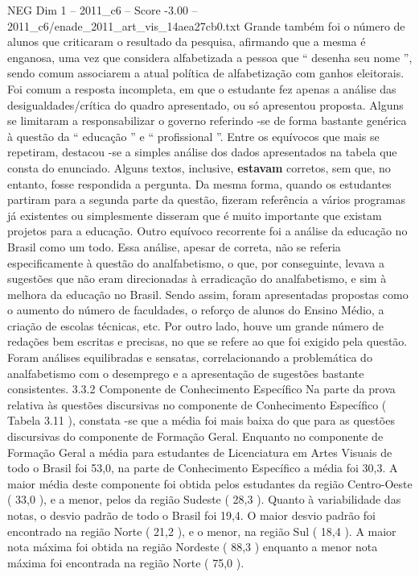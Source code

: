 \begin{textsample}{NEG Dim 1 – 2011\_c6 – Score -3.00 – 2011\_c6/enade\_2011\_art\_vis\_14aea27cb0.txt}
Grande também foi o número de alunos que criticaram o resultado da pesquisa, afirmando que a mesma é enganosa, uma vez que considera alfabetizada a pessoa que “ desenha seu nome ”, sendo comum associarem a atual política de alfabetização com ganhos eleitorais.
Foi comum a resposta incompleta, em que o estudante fez apenas a análise das desigualdades/crítica do quadro apresentado, ou só apresentou proposta.
Alguns se limitaram a responsabilizar o governo referindo -se de forma bastante genérica à questão da “ educação ” e “ profissional ”.
Entre os equívocos que mais se repetiram, destacou -se a simples análise dos dados apresentados na tabela que consta do enunciado.
Alguns textos, inclusive, \textbf{estavam} corretos, sem que, no entanto, fosse respondida a pergunta.
Da mesma forma, quando os estudantes partiram para a segunda parte da questão, fizeram referência a vários programas já existentes ou simplesmente disseram que é muito importante que existam projetos para a educação.
Outro equívoco recorrente foi a análise da educação no Brasil como um todo.
Essa análise, apesar de correta, não se referia especificamente à questão do analfabetismo, o que, por conseguinte, levava a sugestões que não eram direcionadas à erradicação do analfabetismo, e sim à melhora da educação no Brasil.
Sendo assim, foram apresentadas propostas como o aumento do número de faculdades, o reforço de alunos do Ensino Médio, a criação de escolas técnicas, etc.
Por outro lado, houve um grande número de redações bem escritas e precisas, no que se refere ao que foi exigido pela questão.
Foram análises equilibradas e sensatas, correlacionando a problemática do analfabetismo com o desemprego e a apresentação de sugestões bastante consistentes. 3.3.2 Componente de Conhecimento Específico Na parte da prova relativa às questões discursivas no componente de Conhecimento Específico ( Tabela 3.11 ), constata -se que a média foi mais baixa do que para as questões discursivas do componente de Formação Geral.
Enquanto no componente de Formação Geral a média para estudantes de Licenciatura em Artes Visuais de todo o Brasil foi 53,0, na parte de Conhecimento Específico a média foi 30,3.
A maior média deste componente foi obtida pelos estudantes da região Centro-Oeste ( 33,0 ), e a menor, pelos da região Sudeste ( 28,3 ).
Quanto à variabilidade das notas, o desvio padrão de todo o Brasil foi 19,4.
O maior desvio padrão foi encontrado na região Norte ( 21,2 ), e o menor, na região Sul ( 18,4 ).
A maior nota máxima foi obtida na região Nordeste ( 88,3 ) enquanto a menor nota máxima foi encontrada na região Norte ( 75,0 ).

\end{textsample}
